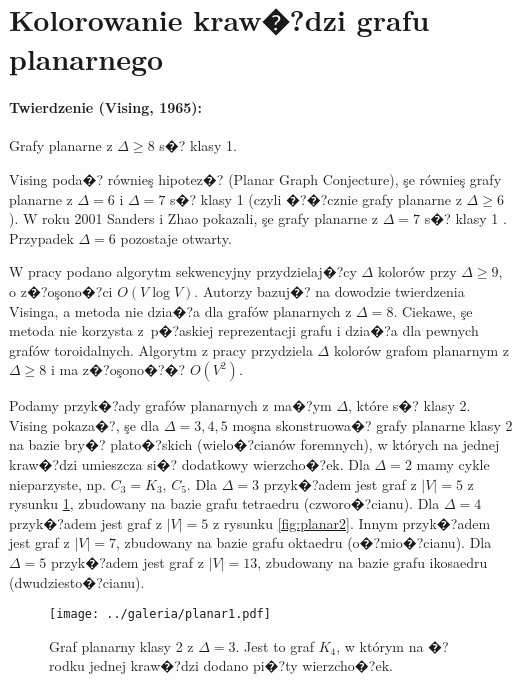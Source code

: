 \documentclass[12pt,a4paper]{mwrep}
\begin{document}
\section{Kolorowanie kraw�?dzi grafu planarnego}
\label{sec:kolorowanie_krawedzi_planarny}

\paragraph{Twierdzenie (Vising, 1965):} Grafy planarne 
z $\Delta \ge 8$ s�? klasy 1.

Vising poda�? równieş hipotez�? (Planar Graph Conjecture), 
şe równieş grafy planarne z $\Delta=6$
i $\Delta=7$ s�? klasy 1 (czyli �?�?cznie grafy planarne z $\Delta \ge 6$).
W roku 2001 Sanders i Zhao pokazali, şe grafy planarne z $\Delta=7$
s�? klasy 1 \cite{2001_Sanders_Zhao}.
Przypadek $\Delta=6$ pozostaje otwarty.

W pracy \cite{1990_Chrobak_Nishizeki} podano algorytm sekwencyjny
przydzielaj�?cy $\Delta$ kolorów przy $\Delta \ge 9$,
o z�?oşono�?ci $O(V \log V)$.
Autorzy bazuj�? na dowodzie twierdzenia Visinga, a
metoda nie dzia�?a dla grafów planarnych z $\Delta=8$.
Ciekawe, şe metoda nie korzysta z~p�?askiej reprezentacji grafu
i dzia�?a dla pewnych grafów toroidalnych.
Algorytm z pracy \cite{1985_Gabow} przydziela $\Delta$ kolorów
grafom planarnym z $\Delta \ge 8$ i ma z�?oşono�?�? $O(V^2)$.

Podamy przyk�?ady grafów planarnych z ma�?ym $\Delta$, które s�? klasy 2.
Vising pokaza�?, şe dla $\Delta=3,4,5$ moşna skonstruowa�? grafy
planarne klasy 2 na bazie bry�? plato�?skich (wielo�?cianów foremnych),
w których na jednej kraw�?dzi umieszcza si�? dodatkowy wierzcho�?ek.
Dla $\Delta=2$ mamy cykle nieparzyste, np. $C_3=K_3$, $C_5$.
Dla $\Delta=3$ przyk�?adem jest graf z $|V|=5$ z rysunku \ref{fig:planar1},
zbudowany na bazie grafu tetraedru (czworo�?cianu).
Dla $\Delta=4$ przyk�?adem jest graf z $|V|=5$ z rysunku \ref{fig:planar2}.
Innym przyk�?adem jest graf z $|V|=7$,
zbudowany na bazie grafu oktaedru (o�?mio�?cianu).
Dla $\Delta=5$ przyk�?adem jest graf z $|V|=13$,
zbudowany na bazie grafu ikosaedru (dwudziesto�?cianu).


\begin{figure}[h]
\centering
\texttt{[image: ../galeria/planar1.pdf]}
\caption[Graf planarny klasy 2 z $\Delta=3$.]{
\label{fig:planar1}
Graf planarny klasy 2 z $\Delta=3$.
Jest to graf $K_4$, w którym na �?rodku jednej kraw�?dzi dodano
pi�?ty wierzcho�?ek.}
\end{figure}
\end{document}
